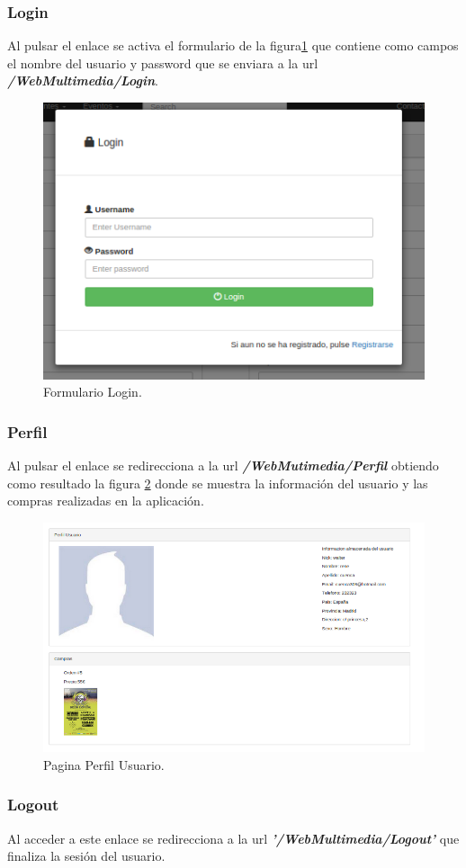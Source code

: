 \subsubsection*{Login}
Al pulsar el enlace se activa el formulario de la figura\ref{fig:Form_Login} que contiene como campos el nombre del usuario y password que se enviara a la url\textit{\textbf{ /WebMultimedia/Login}}.
\begin{figure}[!h]
\begin{center}
   \includegraphics[width=0.4\linewidth]{Figures/Login}
  \decoRule
  \caption[Formulario Login]{Formulario Login.}
\label{fig:Form_Login}
\end{center}
\end{figure}
\subsubsection*{Perfil}
Al pulsar el enlace se redirecciona a la url \textbf{\textit{/WebMutimedia/Perfil}} obtiendo como resultado la figura \ref{fig:Perfil_user} donde se muestra la información del usuario y las compras realizadas en la aplicación.
\begin{figure}[!h]
\begin{center}
   \includegraphics[width=0.6\linewidth]{Figures/ProfileUser}
  \decoRule
  \caption[Perfil Usuario]{Pagina Perfil Usuario.}
\label{fig:Perfil_user}
\end{center}
\end{figure}
\subsubsection*{Logout}
Al acceder a este enlace se redirecciona a la url \textbf{\textit{'/WebMultimedia/Logout'}} que finaliza la sesión del usuario.

